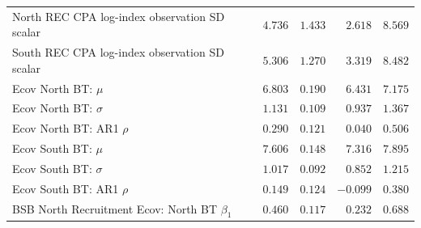 \documentclass[
]{article}
\begin{document}
\begin{landscape}
\begin{longtable}[t]{lrrrr}
North REC CPA log-index observation SD scalar & $4.736$ & $1.433$ & $2.618$ & $8.569$\\
South REC CPA log-index observation SD scalar & $5.306$ & $1.270$ & $3.319$ & $8.482$\\
Ecov North BT: $\mu$ & $6.803$ & $0.190$ & $6.431$ & $7.175$\\
Ecov North BT: $\sigma$ & $1.131$ & $0.109$ & $0.937$ & $1.367$\\
\addlinespace
Ecov North BT: AR1 $\rho$ & $0.290$ & $0.121$ & $0.040$ & $0.506$\\
Ecov South BT: $\mu$ & $7.606$ & $0.148$ & $7.316$ & $7.895$\\
Ecov South BT: $\sigma$ & $1.017$ & $0.092$ & $0.852$ & $1.215$\\
Ecov South BT: AR1 $\rho$ & $0.149$ & $0.124$ & $-0.099$ & $0.380$\\
BSB North Recruitment Ecov: North BT $\beta_1$ & $0.460$ & $0.117$ & $0.232$ & $0.688$\\*
\end{longtable}
\end{landscape}
\end{document}

